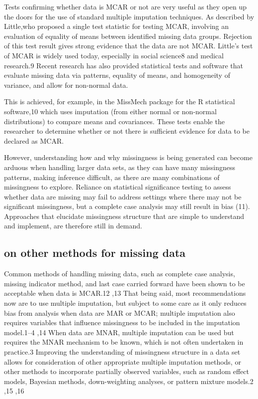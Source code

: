 \documentclass[]{article}
\begin{document}
Tests confirming whether data is MCAR or not are very useful as they
open up the doors for the use of standard multiple imputation
techniques. As described by Little,who proposed a single test statistic
for testing MCAR, involving an evaluation of equality of means between
identified missing data groups. Rejection of this test result gives
strong evidence that the data are not MCAR. Little's test of MCAR is
widely used today, especially in social science8 and medical research.9
Recent research has also provided statistical tests and software that
evaluate missing data via patterns, equality of means, and homogeneity
of variance, and allow for non-normal data.

This is achieved, for example, in the MissMech package for the R
statistical software,10 which uses imputation (from either normal or
non-normal distributions) to compare means and covariances. These tests
enable the researcher to determine whether or not there is sufficient
evidence for data to be declared as MCAR.

However, understanding how and why missingness is being generated can
become arduous when handling larger data sets, as they can have many
missingness patterns, making inference difficult, as there are many
combinations of missingness to explore. Reliance on statistical
significance testing to assess whether data are missing may fail to
address settings where there may not be significant missingness, but a
complete case analysis may still result in bias (11). Approaches that
elucidate missingness structure that are simple to understand and
implement, are therefore still in demand.

\subsection{on other methods for missing
data}\label{on-other-methods-for-missing-data}

Common methods of handling missing data, such as complete case analysis,
missing indicator method, and last case carried forward have been shown
to be acceptable when data is MCAR.12 ,13 That being said, most
recommendations now are to use multiple imputation, but subject to some
care as it only reduces bias from analysis when data are MAR or MCAR;
multiple imputation also requires variables that influence missingness
to be included in the imputation model.1--4 ,14 When data are MNAR,
multiple imputation can be used but requires the MNAR mechanism to be
known, which is not often undertaken in practice.3 Improving the
understanding of missingness structure in a data set allows for
consideration of other appropriate multiple imputation methods, or other
methods to incorporate partially observed variables, such as random
effect models, Bayesian methods, down-weighting analyses, or pattern
mixture models.2 ,15 ,16
\end{document}
